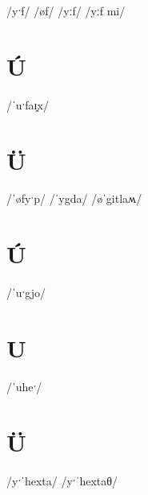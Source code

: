 \documentclass[10pt,a4paper,twoside]{book}
\begin{document}
\begin{multicols}{3}
 {/yˑf/} {}
 {/øf/} {}
 {/yːf/} {}
 {/yːf mi/} {}
\end{multicols}

\section*{Ú}

\begin{multicols}{3}
 {/ˈuˑfaɪ̯x/} {}
\end{multicols}

\section*{Ü}

\begin{multicols}{3}
 {/ˈøfyˑp/} {}
 {/ˈygda/} {}
 {/øˈgitlaʍ/} {}
\end{multicols}

\section*{Ú}

\begin{multicols}{3}
 {/ˈuˑgjo/} {}
\end{multicols}

\section*{U}

\begin{multicols}{3}
 {/ˈuheˑ/} {}
\end{multicols}

\section*{Ü}

\begin{multicols}{3}
 {/yˑˈhexta/} {}
 {/yˑˈhextaθ/} {}
\end{multicols}
\end{document}
